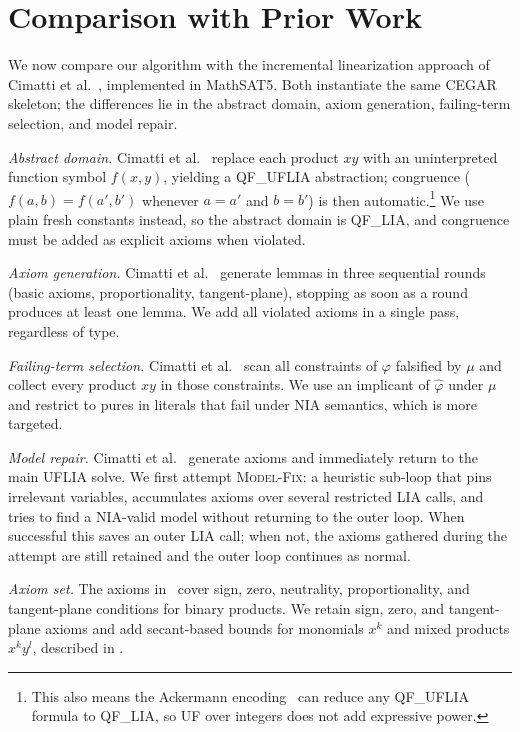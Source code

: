 \section{Comparison with Prior Work}\label{sec:comparison}

We now compare our algorithm with the incremental linearization approach of
Cimatti et al.~\cite{cimatti2018sat}, implemented in MathSAT5.
Both instantiate the same CEGAR skeleton; the differences lie in the abstract
domain, axiom generation, failing-term selection, and model repair.

\emph{Abstract domain.}
Cimatti et al.~\cite{cimatti2018sat} replace each product $x y$ with an uninterpreted
function symbol $f(x,y)$, yielding a QF\_UFLIA abstraction; congruence
($f(a,b) = f(a',b')$ whenever $a=a'$ and $b=b'$) is then automatic.\footnote{This also means the Ackermann encoding~\cite{ackermann54} can reduce any QF\_UFLIA formula to QF\_LIA, so UF over integers does not add expressive power.}
We use plain fresh constants instead, so the abstract domain is QF\_LIA, and
congruence must be added as explicit axioms when violated.

\emph{Axiom generation.}
Cimatti et al.~\cite{cimatti2018sat} generate lemmas in three sequential rounds (basic axioms,
proportionality, tangent-plane), stopping as soon as a round produces at
least one lemma.
We add all violated axioms in a single pass, regardless of type.

\emph{Failing-term selection.}
Cimatti et al.~\cite{cimatti2018sat} scan all constraints of $\varphi$ falsified by $\mu$ and
collect every product $x y$ in those constraints.
We use an implicant of $\hat\varphi$ under $\mu$ and restrict to pures in
literals that fail under NIA semantics, which is more targeted.

\emph{Model repair.}
Cimatti et al.~\cite{cimatti2018sat} generate axioms and immediately return to the main UFLIA solve.
We first attempt \textsc{Model-Fix}: a heuristic sub-loop that pins irrelevant variables,
accumulates axioms over several restricted LIA calls, and tries to find a
NIA-valid model without returning to the outer loop.
When successful this saves an outer LIA call; when not, the axioms gathered
during the attempt are still retained and the outer loop continues as normal.

\emph{Axiom set.}
The axioms in~\cite{cimatti2018sat} cover sign, zero, neutrality,
proportionality, and tangent-plane conditions for binary products.
We retain sign, zero, and tangent-plane axioms and add secant-based bounds for
monomials $x^k$ and mixed products $x^k y^l$, described in .
